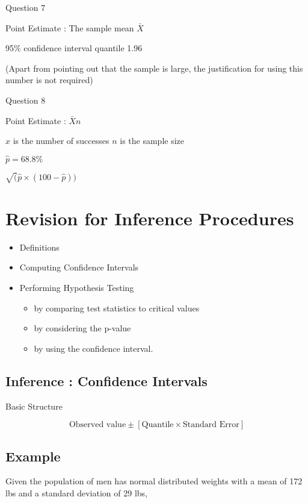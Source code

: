 {%
Question 7

Point Estimate : The sample mean $\bar{X}$

95\% confidence interval quantile 1.96 

(Apart from pointing out that the sample is large, the justification for using this number is not required)

Question 8

Point Estimate : $\bar{X}{n}$

$x$ is the number of successes
$n$ is the sample size

$\hat{p} = 68.8\%$


$\sqrt(\hat{p} \times (100-\hat{p} ))$


\section{Revision for Inference Procedures}

\begin{itemize}
\item Definitions
\item Computing Confidence Intervals 
\item Performing Hypothesis Testing
\begin{itemize}
\item by comparing test statistics to critical values
\item by considering the p-value
\item by using the confidence interval.
\end{itemize}
\end{itemize}





{
\subsection{Inference : Confidence Intervals }

Basic Structure

\[ \mbox{Observed value} \pm [\mbox{Quantile}\times \mbox{Standard Error}] \] 



{
\subsection{Example}
Given the population of men has normal distributed weights with a mean of 172 lbs and a standard deviation of 29 lbs,



}}}
